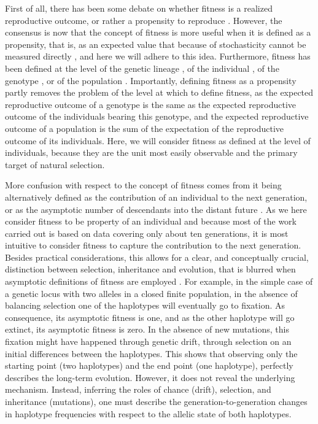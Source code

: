 First of all, there has been some debate on whether fitness is a realized reproductive outcome, or rather a propensity to reproduce \parencite{Brandon1984}. However, the consensus is now that the concept of fitness is more useful when it is defined as a propensity, that is, as an expected value that because of stochasticity cannot be measured directly  \parencite{Brandon1984,Price1996,Krimbas2004}, and here we will adhere to this idea. Furthermore, fitness has been defined at the level of the genetic lineage \parencite[e.g.][]{Akc2016}, of the individual \parencite[e.g.][]{Cam2000}, of the genotype \parencite[e.g.][]{Steiner2012}, or of the population \parencite[e.g.][]{vanTienderen2000}. Importantly, defining fitness as a propensity partly removes the problem of the level at which to define fitness, as the expected reproductive outcome of a genotype is the same as the expected reproductive outcome of the individuals bearing this genotype, and the expected reproductive outcome of a population is the sum of the expectation of the reproductive outcome of its individuals. Here, we will consider fitness as defined at the level of individuals, because they are the unit most easily observable and the primary target of natural selection.



More confusion with respect to the concept of fitness comes from it being alternatively defined as the contribution of an individual to the next generation, or as the asymptotic number of descendants into the distant future %
 \parencite{Wade2006}. As we here consider fitness to be property of an individual and because most of the work carried out is based on data covering only about ten generations, it is most intuitive to consider fitness to capture the contribution to the next generation. Besides practical considerations, this allows for a clear, and conceptually crucial, distinction between selection, inheritance and evolution, that is blurred when asymptotic definitions of fitness are employed \parencite{Fisher1930, Arnold1984}. For example, in the simple case of a genetic locus with two alleles in a closed finite population, in the absence of balancing selection one of the haplotypes will eventually go to fixation. As consequence, its asymptotic fitness is one, and as the other haplotype will go extinct, its asymptotic fitness is zero. 
 In the absence of new mutations, this fixation might have happened through genetic drift, through selection on an initial differences between the haplotypes. This shows that observing only the starting point (two haplotypes) and the end point (one haplotype), perfectly describes the long-term evolution. However, it does not reveal the underlying mechanism. Instead,  inferring the roles of chance (drift), selection, and inheritance (mutations), one must describe the generation-to-generation changes in haplotype frequencies with respect to the allelic state of both haplotypes. 



